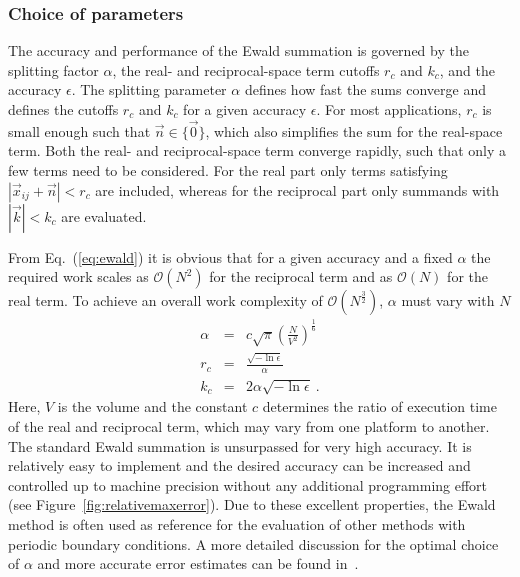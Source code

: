 \documentclass[11pt]{article}
\begin{document}
\subsubsection*{Choice of parameters}

The accuracy and performance of the Ewald summation is governed 
by the splitting factor $\alpha$, the real- and reciprocal-space term
cutoffs $r_c$ and $k_c$, and the accuracy $\epsilon$.
The splitting parameter $\alpha$ defines how
fast the sums converge and defines the cutoffs $r_c$ and $k_c$ for a given
accuracy $\epsilon$. For most applications, $r_c$ is small enough such that
$\vec{n} \in \{ \vec{0} \}$, which also simplifies the sum for the
real-space term. 
Both the real- and reciprocal-space term converge rapidly, such that
only a few terms need to be considered.
For the real part only terms satisfying $|\vec{x}_{ij} + \vec{n}| < r_c$ are
included, whereas for the reciprocal part only summands with $|\vec{k}|
< k_c$ are evaluated. 

From Eq.\ (\ref{eq:ewald}) it is obvious that for
a given accuracy and a fixed $\alpha$ the required work scales as
$\mathcal{O}(N^2)$ for the reciprocal term and as $\mathcal{O}(N)$ for
the real term. To achieve an overall work complexity of
$\mathcal{O}(N^{\frac{3}{2}})$, $\alpha$ must vary with $N$
\begin{eqnarray}
\alpha &=& c\sqrt{\pi} \left (  \frac{N}{V^2}\right )
^\frac{1}{6} 
\label{eq:ewald-alpha}\\
r_c  &=& \frac{\sqrt{-\ln \epsilon }}{\alpha}\label{eq:ewald-rc} \\
k_c &=& 2 \alpha \sqrt{-\ln \epsilon } ~.
\label{eq:ewald-kc}
\end{eqnarray}
Here, $V$ is the volume and the constant $c$ determines the ratio of
execution time of the real and reciprocal term, which may vary from one
platform to another. The standard Ewald summation is unsurpassed for
very high accuracy. It is relatively easy to implement and the desired
accuracy can be increased and controlled up to machine precision
without any additional programming effort (see Figure~\ref{fig:relativemaxerror}). Due to
these excellent properties, the Ewald method is often used as
reference for the evaluation of other methods with periodic
boundary conditions. A more detailed discussion for the optimal choice of
$\alpha$ and more accurate error estimates can be found in~\cite{DeHo98,Finc94,KoPe92,Pete95}.
\end{document}
